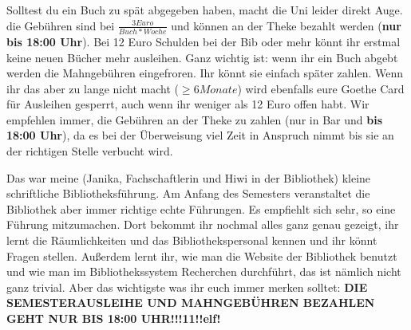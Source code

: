 Solltest du ein Buch zu spät abgegeben haben, macht die Uni leider direkt Auge. die Gebühren sind bei $\frac{3 Euro}{Buch*Woche}$ und können an der Theke bezahlt werden (\textbf{nur bis 18:00 Uhr}). Bei 12 Euro Schulden bei der Bib oder mehr könnt ihr erstmal keine neuen Bücher mehr ausleihen. Ganz wichtig ist: wenn ihr ein Buch abgebt werden die Mahngebühren eingefroren. Ihr könnt sie einfach später zahlen. Wenn ihr das aber zu lange nicht macht ($\geq 6 Monate$) wird ebenfalls eure Goethe Card für Ausleihen gesperrt, auch wenn ihr weniger als 12 Euro offen habt. Wir empfehlen immer, die Gebühren an der Theke zu zahlen (nur in Bar und \textbf{bis 18:00 Uhr}), da es bei der Überweisung viel Zeit in Anspruch nimmt bis sie an der richtigen Stelle verbucht wird. \par

Das war meine (Janika, Fachschaftlerin und Hiwi in der Bibliothek) kleine schriftliche Bibliotheksführung. Am Anfang des Semesters veranstaltet die Bibliothek aber immer \glqq richtige echte \grqq Führungen. Es empfiehlt sich sehr, so eine Führung mitzumachen. Dort bekommt ihr nochmal alles ganz genau gezeigt, ihr lernt die Räumlichkeiten und das Bibliothekspersonal kennen und ihr könnt Fragen stellen. Außerdem lernt ihr, wie man die Website der Bibliothek benutzt und wie man im Bibliothekssystem Recherchen durchführt, das ist nämlich nicht ganz trivial.
Aber das wichtigste was ihr euch immer merken solltet: \textbf{DIE SEMESTERAUSLEIHE UND MAHNGEBÜHREN BEZAHLEN GEHT NUR BIS 18:00 UHR!!!11!!elf!}




